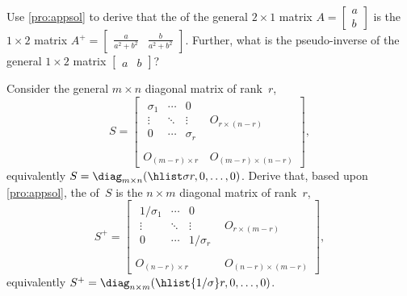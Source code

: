 \begin{exercise} \label{ex:} 
Use \autoref{pro:appsol} to derive that the  of the general \(2\times 1\) matrix \(A=\begin{bmatrix} a\\b \end{bmatrix}\) is the \(1\times 2\) matrix \(A^+=\begin{bmatrix} \tfrac a{a^2+b^2}&\tfrac b{a^2+b^2} \end{bmatrix}\).  
Further, what is the pseudo-inverse of the general \(1\times2\) matrix \(\begin{bmatrix} a&b \end{bmatrix}\)?
\end{exercise}





\begin{exercise} \label{ex:pidiag} 
Consider the general \(m\times n\) diagonal matrix of rank~\(r\), 
\begin{equation*}
S=\begin{bmatrix} \begin{matrix} \sigma_1&\cdots&0\\
\vdots&\ddots&\vdots\\
0&\cdots&\sigma_r \end{matrix} & 
O_{r\times (n-r)}\\\,\\
O_{(m-r)\times r}&O_{(m-r)\times (n-r)}\end{bmatrix},
\end{equation*}
equivalently \(S=\diag_{m\times n}(\hlist\sigma r,0,\ldots,0)\).
Derive that, based upon \autoref{pro:appsol}, the  of~\(S\) is the \(n\times m\) diagonal matrix of rank~\(r\),
\begin{equation*}
S^+=\begin{bmatrix} \begin{matrix} 1/{\sigma_1}&\cdots&0\\
\vdots&\ddots&\vdots\\
0&\cdots&1/\sigma_r \end{matrix} & 
O_{r\times (m-r)}\\\,\\
O_{(n-r)\times r}&O_{(n-r)\times (m-r)}\end{bmatrix},
\end{equation*}
equivalently \(S^+=\diag_{n\times m}(\hlist{1/\sigma}r,0,\ldots,0)\).
\end{exercise}





